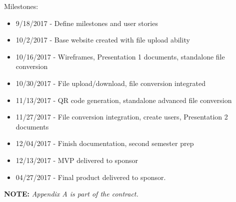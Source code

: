 Milestones:

\begin{itemize}
	\item 9/18/2017    - Define milestones and user stories
	
	\item 10/2/2017    - Base website created with file upload ability
	
	\item 10/16/2017  - Wireframes, Presentation 1 documents, standalone file conversion
	
	\item 10/30/2017  - File upload/download, file conversion integrated
	
	\item 11/13/2017  - QR code generation, standalone advanced file conversion 
	
	\item 11/27/2017  - File conversion integration, create users, Presentation 2 documents
	
	\item 12/04/2017   - Finish documentation, second semester prep
	
	\item 12/13/2017  - MVP delivered to sponsor

	\item 04/27/2017  - Final product delivered to sponsor.
\end{itemize}


\vspace{2\baselineskip}
\centerline{\Large {\bf NOTE:} {\em Appendix A is part of the contract.}}

